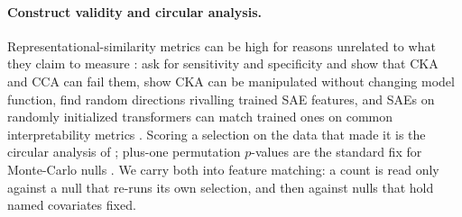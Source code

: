 \paragraph{Construct validity and circular analysis.}
Representational-similarity metrics can be high for reasons unrelated to what they claim to
measure \citep[surveyed by][]{klabunde2023similarity}: \citet{ding2021grounding} ask for
sensitivity and specificity and show that CKA and CCA \citep{kornblith2019cka} can fail them,
\citet{davari2023reliability} show CKA can be manipulated without changing model function,
\citet{korznikov2026sanity} find random directions rivalling trained SAE features, and SAEs on
randomly initialized transformers can match trained ones on common interpretability metrics
\citep{heap2025random}. Scoring a
selection on the data that made it is the circular analysis of
\citet{kriegeskorte2009circular}; plus-one permutation $p$-values are the standard fix for
Monte-Carlo nulls \citep{phipson2010permutation}. We carry both into feature matching: a count is
read only against a null that re-runs its own selection, and then against nulls that hold named
covariates fixed.
